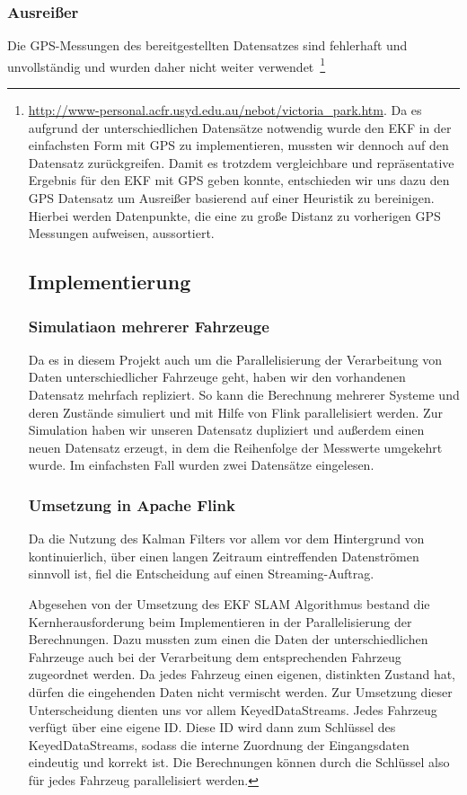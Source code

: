 \documentclass[11pt]{scrartcl}
\begin{document}
\subsubsection{Ausreißer}
Die GPS-Messungen des bereitgestellten Datensatzes sind fehlerhaft und unvollständig und wurden daher nicht weiter verwendet~\footnote{\url{http://www-personal.acfr.usyd.edu.au/nebot/victoria_park.htm}. Da es aufgrund der unterschiedlichen Datensätze notwendig wurde den EKF in der einfachsten Form mit GPS zu implementieren, mussten wir dennoch auf den Datensatz zurückgreifen. Damit es trotzdem vergleichbare und repräsentative Ergebnis für den EKF mit GPS geben konnte, entschieden wir uns dazu den GPS Datensatz um Ausreißer basierend auf einer Heuristik zu bereinigen. Hierbei werden Datenpunkte, die eine zu große Distanz zu vorherigen GPS Messungen aufweisen, aussortiert.

\subsection{Implementierung}\label{Implementierung}

\subsubsection{Simulatiaon mehrerer Fahrzeuge}
Da es in diesem Projekt auch um die Parallelisierung der Verarbeitung von Daten unterschiedlicher Fahrzeuge geht, haben wir den vorhandenen Datensatz mehrfach repliziert. So kann die Berechnung mehrerer Systeme und deren Zustände simuliert und mit Hilfe von Flink parallelisiert werden. Zur Simulation haben wir unseren Datensatz dupliziert und außerdem einen neuen Datensatz erzeugt, in dem die Reihenfolge der Messwerte umgekehrt wurde. Im einfachsten Fall wurden zwei Datensätze eingelesen.

\subsubsection{Umsetzung in Apache Flink}
Da die Nutzung des Kalman Filters vor allem vor dem Hintergrund von kontinuierlich, über einen langen Zeitraum eintreffenden Datenströmen sinnvoll ist, fiel die Entscheidung auf einen Streaming-Auftrag.

Abgesehen von der Umsetzung des EKF SLAM Algorithmus bestand die Kernherausforderung beim Implementieren in der Parallelisierung der Berechnungen. Dazu mussten zum einen die Daten der unterschiedlichen Fahrzeuge auch bei der Verarbeitung dem entsprechenden Fahrzeug zugeordnet werden. Da jedes Fahrzeug einen eigenen, distinkten Zustand hat, dürfen die eingehenden Daten nicht vermischt werden. Zur Umsetzung dieser Unterscheidung dienten uns vor allem KeyedDataStreams. Jedes Fahrzeug verfügt über eine eigene ID. Diese ID wird dann zum Schlüssel des KeyedDataStreams, sodass die interne Zuordnung der Eingangsdaten eindeutig und korrekt ist. Die Berechnungen können durch die Schlüssel also für jedes Fahrzeug parallelisiert werden.

}
\end{document}
